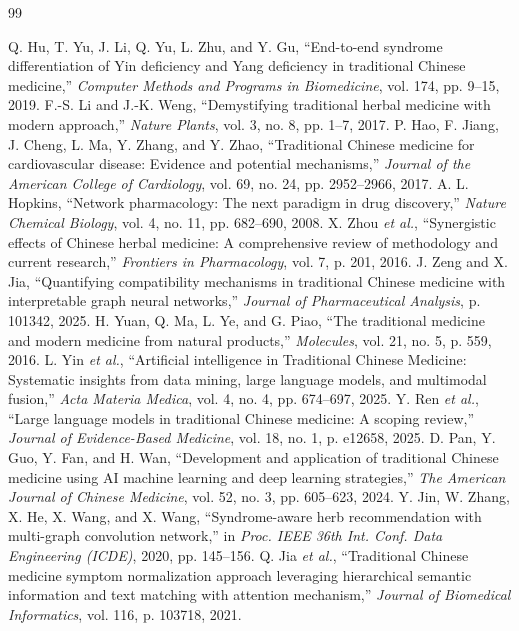 \documentclass[journal,twoside,web]{ieeecolor}
\begin{document}
\begin{thebibliography}{99}

 Q. Hu, T. Yu, J. Li, Q. Yu, L. Zhu, and Y. Gu, ``End-to-end syndrome differentiation of Yin deficiency and Yang deficiency in traditional Chinese medicine,'' \textit{Computer Methods and Programs in Biomedicine}, vol. 174, pp. 9--15, 2019.
 F.-S. Li and J.-K. Weng, ``Demystifying traditional herbal medicine with modern approach,'' \textit{Nature Plants}, vol. 3, no. 8, pp. 1--7, 2017.
 P. Hao, F. Jiang, J. Cheng, L. Ma, Y. Zhang, and Y. Zhao, ``Traditional Chinese medicine for cardiovascular disease: Evidence and potential mechanisms,'' \textit{Journal of the American College of Cardiology}, vol. 69, no. 24, pp. 2952--2966, 2017.
 A. L. Hopkins, ``Network pharmacology: The next paradigm in drug discovery,'' \textit{Nature Chemical Biology}, vol. 4, no. 11, pp. 682--690, 2008.
 X. Zhou \textit{et al.}, ``Synergistic effects of Chinese herbal medicine: A comprehensive review of methodology and current research,'' \textit{Frontiers in Pharmacology}, vol. 7, p. 201, 2016.
 J. Zeng and X. Jia, ``Quantifying compatibility mechanisms in traditional Chinese medicine with interpretable graph neural networks,'' \textit{Journal of Pharmaceutical Analysis}, p. 101342, 2025.
 H. Yuan, Q. Ma, L. Ye, and G. Piao, ``The traditional medicine and modern medicine from natural products,'' \textit{Molecules}, vol. 21, no. 5, p. 559, 2016.
 L. Yin \textit{et al.}, ``Artificial intelligence in Traditional Chinese Medicine: Systematic insights from data mining, large language models, and multimodal fusion,'' \textit{Acta Materia Medica}, vol. 4, no. 4, pp. 674--697, 2025.
 Y. Ren \textit{et al.}, ``Large language models in traditional Chinese medicine: A scoping review,'' \textit{Journal of Evidence-Based Medicine}, vol. 18, no. 1, p. e12658, 2025.
 D. Pan, Y. Guo, Y. Fan, and H. Wan, ``Development and application of traditional Chinese medicine using AI machine learning and deep learning strategies,'' \textit{The American Journal of Chinese Medicine}, vol. 52, no. 3, pp. 605--623, 2024.
 Y. Jin, W. Zhang, X. He, X. Wang, and X. Wang, ``Syndrome-aware herb recommendation with multi-graph convolution network,'' in \textit{Proc. IEEE 36th Int. Conf. Data Engineering (ICDE)}, 2020, pp. 145--156.
 Q. Jia \textit{et al.}, ``Traditional Chinese medicine symptom normalization approach leveraging hierarchical semantic information and text matching with attention mechanism,'' \textit{Journal of Biomedical Informatics}, vol. 116, p. 103718, 2021.

\end{thebibliography}
\end{document}
